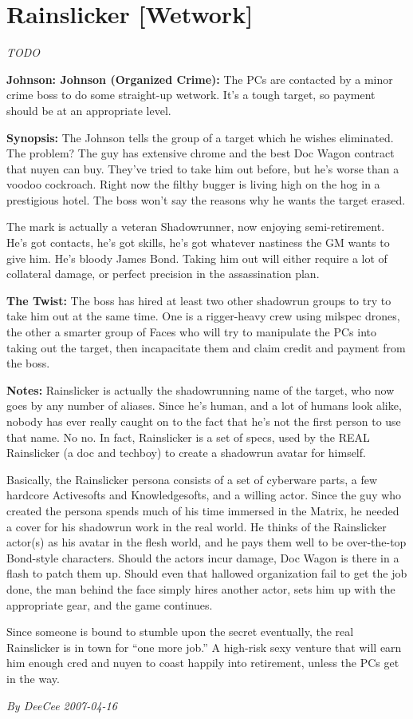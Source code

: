 \documentclass[letterpaper,twocolumn,10.5pt]{article}
\newenvironment{scenario}[6]
	{
		\section{#1 {\small[#2]}}
		\textit{#3}
		\def\TMPSCENARIO{#4 #5}
	}
	{\small\textit{By \TMPSCENARIO}}
\newcommand{\johnson}[2]{\textbf{Johnson: #1 (#2):}}
\newcommand{\synopsis}{\textbf{Synopsis: }}
\newcommand{\notes}{\textbf{Notes: }}
\newcommand{\twist}{\textbf{The Twist: }}
\begin{document}
\begin{scenario}{Rainslicker}
	{Wetwork}
	{TODO}
	{DeeCee}
	{2007-04-16}
	{https://forum.rpg.net/showthread.php?321504-Shadowrun-4th-101-Instant-Scenarios\&p=7175552#post7175552}

\johnson{Johnson}{Organized Crime} 
The PCs are contacted by a minor crime boss to do some straight-up wetwork. It's a tough target, so payment should be at an appropriate level.

\synopsis The Johnson tells the group of a target which he wishes eliminated. The problem? The guy has extensive chrome and the best Doc Wagon contract that nuyen can buy. They've tried to take him out before, but he's worse than a voodoo cockroach. Right now the filthy bugger is living high on the hog in a prestigious hotel. The boss won't say the reasons why he wants the target erased.

The mark is actually a veteran Shadowrunner, now enjoying semi-retirement. He's got contacts, he's got skills, he's got whatever nastiness the GM wants to give him. He's bloody James Bond. Taking him out will either require a lot of collateral damage, or perfect precision in the assassination plan.

\twist The boss has hired at least two other shadowrun groups to try to take him out at the same time. One is a rigger-heavy crew using milspec drones, the other a smarter group of Faces who will try to manipulate the PCs into taking out the target, then incapacitate them and claim credit and payment from the boss.

\notes Rainslicker is actually the shadowrunning name of the target, who now goes by any number of aliases. Since he's human, and a lot of humans look alike, nobody has ever really caught on to the fact that he's not the first person to use that name. No no. In fact, Rainslicker is a set of specs, used by the REAL Rainslicker (a doc and techboy) to create a shadowrun avatar for himself.

Basically, the Rainslicker persona consists of a set of cyberware parts, a few hardcore Activesofts and Knowledgesofts, and a willing actor. Since the guy who created the persona spends much of his time immersed in the Matrix, he needed a cover for his shadowrun work in the real world. He thinks of the Rainslicker actor(s) as his avatar in the flesh world, and he pays them well to be over-the-top Bond-style characters. Should the actors incur damage, Doc Wagon is there in a flash to patch them up. Should even that hallowed organization fail to get the job done, the man behind the face simply hires another actor, sets him up with the appropriate gear, and the game continues.

Since someone is bound to stumble upon the secret eventually, the real Rainslicker is in town for ``one more job.'' A high-risk sexy venture that will earn him enough cred and nuyen to coast happily into retirement, unless the PCs get in the way. 

\end{scenario}
\end{document}
